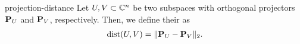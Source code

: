 \begin{Definition}{projection-distance}
  Let $U,V\subset \mathbb C^n$ be two subspaces with orthogonal projectors
  $\mathbf P_U$ and $\mathbf P_V$, respectively. Then, we define their
   as
  \begin{gather}
    \operatorname{dist}(U,V) = \lVert\mathbf P_U-\mathbf P_V\rVert_2.
  \end{gather}
\end{Definition}


